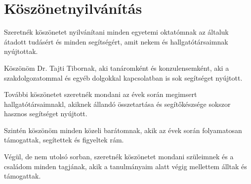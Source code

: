 \documentclass[
]{thesis-ekf}
\theoremstyle{definition}
\theoremstyle{remark}
\begin{document}
\chapter*{Köszönetnyilvánítás}
Szeretnék köszönetet nyilvánítani minden egyetemi oktatómnak az általuk átadott tudásért és minden segítségért,
amit nekem és hallgatótársaimnak nyújtottak.
\par
Köszönöm Dr. Tajti Tibornak, aki tanáromként és konzulensemként, aki a szakdolgozatommal és egyéb dolgokkal kapcsolatban
is sok segítséget nyújtott.
\par
További köszönetet szeretnék mondani az évek során megimsert hallgatótársaimnakl, akiknek állandó összetartása és
segítőkészsége sokszor hasznos segítséget nyújtott.
\par
Szintén köszönöm minden közeli barátomnak, akik az évek során folyamatosan támogattak, segítettek és figyeltek rám.
\par
Végül, de nem utolsó sorban, szeretnék köszönetet mondani szüleimnek és a családom minden tagjának,
akik a tanulmányaim alatt végig mellettem álltak és támogattak.
\end{document}
